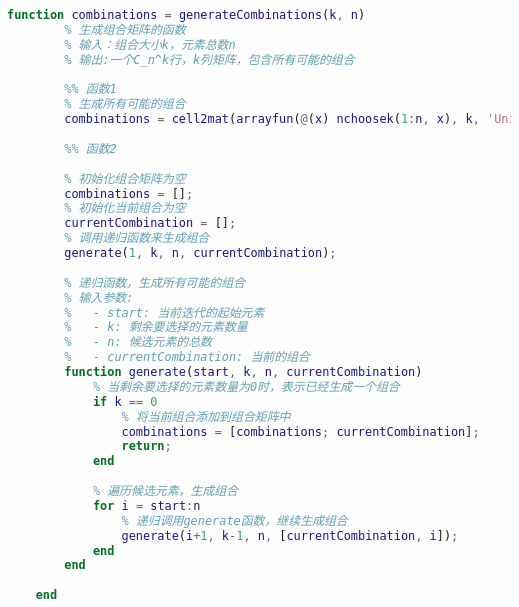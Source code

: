 \begin{lstlisting}[language=Matlab, caption={组合矩阵}, label={generateCombinations}]
	function combinations = generateCombinations(k, n)
	    % 生成组合矩阵的函数
	    % 输入：组合大小k，元素总数n
	    % 输出:一个C_n^k行，k列矩阵，包含所有可能的组合
	    
	    %% 函数1
	    % 生成所有可能的组合
	    combinations = cell2mat(arrayfun(@(x) nchoosek(1:n, x), k, 'UniformOutput', false)');
	
	    %% 函数2
	
	    % 初始化组合矩阵为空
	    combinations = [];
	    % 初始化当前组合为空
	    currentCombination = [];
	    % 调用递归函数来生成组合
	    generate(1, k, n, currentCombination);
	    
	    % 递归函数，生成所有可能的组合
	    % 输入参数:
	    %   - start: 当前迭代的起始元素
	    %   - k: 剩余要选择的元素数量
	    %   - n: 候选元素的总数
	    %   - currentCombination: 当前的组合
	    function generate(start, k, n, currentCombination)
	        % 当剩余要选择的元素数量为0时，表示已经生成一个组合
	        if k == 0
	            % 将当前组合添加到组合矩阵中
	            combinations = [combinations; currentCombination];
	            return;
	        end
	        
	        % 遍历候选元素，生成组合
	        for i = start:n
	            % 递归调用generate函数，继续生成组合
	            generate(i+1, k-1, n, [currentCombination, i]);
	        end
	    end
	    
	end
	
\end{lstlisting}

% 